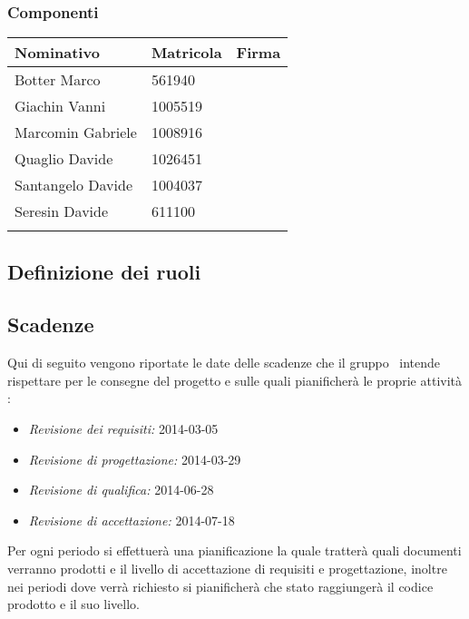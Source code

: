 \subsubsection{Componenti}
\begin{center}
\begin{tabular}{l l l}
\hline
Nominativo & Matricola & Firma\\
\hline
Botter Marco & 561940 & \\ %
\hline
Giachin Vanni & 1005519 & \\ %
\hline
Marcomin Gabriele & 1008916 & \\ %
\hline
Quaglio Davide & 1026451 &  \\ %
\hline
Santangelo Davide & 1004037 & \\ %
\hline
Seresin Davide & 611100 & \\ %
\hline
\\
\end{tabular}
\end{center}
\subsection{Definizione dei ruoli}

\subsection{Scadenze}
\label{subsec:Scadenze}
Qui di seguito vengono riportate le date delle scadenze che il gruppo \gruppo ~intende rispettare per le consegne del progetto e sulle quali pianificherà le proprie attività :
\begin{itemize}
	\item \textit{Revisione dei requisiti: }2014-03-05
	\item \textit{Revisione di progettazione: }2014-03-29
	\item \textit{Revisione di qualifica: }2014-06-28
	\item \textit{Revisione di accettazione: }2014-07-18
\end{itemize}
Per ogni periodo si effettuerà una pianificazione la quale tratterà quali documenti verranno prodotti e il livello di accettazione di requisiti e progettazione, inoltre nei periodi dove verrà richiesto si pianificherà che stato raggiungerà il codice prodotto e il suo livello.
